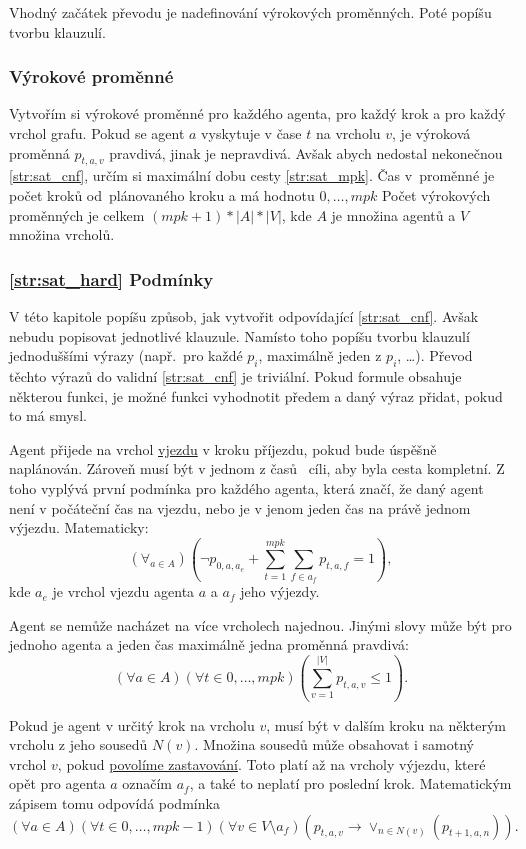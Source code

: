 Vhodný začátek převodu je nadefinování výrokových proměnných.
Poté popíšu tvorbu klauzulí.

\subsubsection{Výrokové proměnné}\label{subsubsec:sat_vyrokove_promenne}

Vytvořím si výrokové proměnné pro každého agenta, pro každý krok a pro každý vrchol grafu.
Pokud se agent $a$ vyskytuje v čase $t$ na vrcholu $v$, je výroková proměnná $p_{t,a,v}$ pravdivá, jinak je nepravdivá.
Avšak abych nedostal nekonečnou \ref{str:sat_cnf}, určím si maximální dobu cesty \ref{str:sat_mpk}.
Čas v~proměnné je počet kroků od~plánovaného kroku a má hodnotu ${0, \dots, mpk}$
Počet výrokových proměnných je celkem $(mpk + 1) * |A| * |V|$, kde $A$ je množina agentů a $V$ množina vrcholů.

\subsubsection{\ref{str:sat_hard} Podmínky}\label{subsubsec:sat_hard_podminky}

V této kapitole popíšu způsob, jak vytvořit odpovídající \ref{str:sat_cnf}.
Avšak nebudu popisovat jednotlivé klauzule.
Namísto toho popíšu tvorbu klauzulí jednoduššími výrazy (např.\ pro každé $p_i$, maximálně jeden z $p_i$, \ldots).
Převod těchto výrazů do validní \ref{str:sat_cnf} je triviální.
Pokud formule obsahuje některou funkci, je možné funkci vyhodnotit předem a daný výraz přidat, pokud to má smysl.

Agent přijede na vrchol \hyperref[par:vjezdy]{vjezdu} v kroku příjezdu, pokud bude úspěšně naplánován.
Zároveň musí být v jednom z časů ~cíli, aby byla cesta kompletní.
Z toho vyplývá první podmínka pro každého agenta, která značí, že daný agent není v počáteční čas na vjezdu,
nebo je v jenom jeden čas na právě jednom výjezdu.
Matematicky:
\[
	(\forall_{a \in A}) \left(\neg p_{0,a,a_e} + \sum_{t=1}^{mpk} \sum_{f \in a_f} p_{t, a, f} = 1\right),
\]
kde $a_e$ je vrchol vjezdu agenta $a$ a $a_f$ jeho výjezdy.

Agent se nemůže nacházet na více vrcholech najednou.
Jinými slovy může být pro jednoho agenta a jeden čas maximálně jedna proměnná pravdivá:
\[
	(\forall a \in A)(\forall t \in {0, \dots, mpk})\left(\sum_{v=1}^{|V|} p_{t,a,v} \leq 1\right).
\]

Pokud je agent v určitý krok na vrcholu $v$, musí být v dalším kroku na některým vrcholu z jeho sousedů $N(v)$.
Množina sousedů může obsahovat i samotný vrchol $v$,
pokud \hyperref[par:sat_povolene_zastavovani]{povolíme zastavování}.
Toto platí až na vrcholy výjezdu, které opět pro agenta $a$ označím $a_f$, a také to neplatí pro poslední krok.
Matematickým zápisem tomu odpovídá podmínka
\[
	(\forall a \in A)(\forall t \in {0, \dots, mpk - 1})
	(\forall v \in V \setminus a_f)(p_{t,a,v} \rightarrow \vee_{n \in N(v)} (p_{t+1,a,n})).
\]

